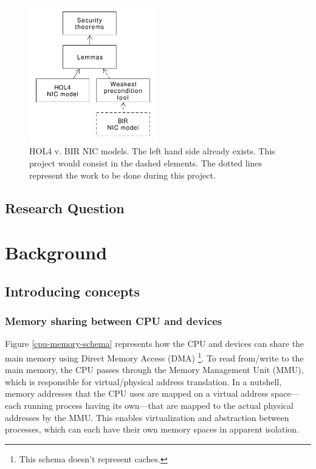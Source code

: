 \documentclass{kththesis}
\begin{document}
\begin{figure}[!ht]
	\includegraphics[height=6cm]{figures/figure-2.png}
	\centering
	\caption{
HOL4 v. BIR NIC models. The left hand side already exists. This project would consist in the dashed elements. The dotted lines represent the work to be done during this project.
}
	\label{hol-v-bir-nic-model-simple}
\end{figure}

\section{Research Question}

\chapter{Background}

\section{Introducing concepts}

\subsection{Memory sharing between CPU and devices}

Figure \ref{cpu-memory-schema} represents how the CPU and devices can share the main memory using Direct Memory Access (DMA) \footnote{This schema doesn't represent caches.}. To read from/write to the main memory, the CPU passes through the Memory Management Unit (MMU), which is responsible for virtual/physical address translation. In a nutshell, memory addresses that the CPU uses are mapped on a virtual address space---each running process having its own---that are mapped to the actual physical addresses by the MMU. This enables virtualization and abstraction between processes, which can each have their own
memory spaces in apparent isolation.
\end{document}
